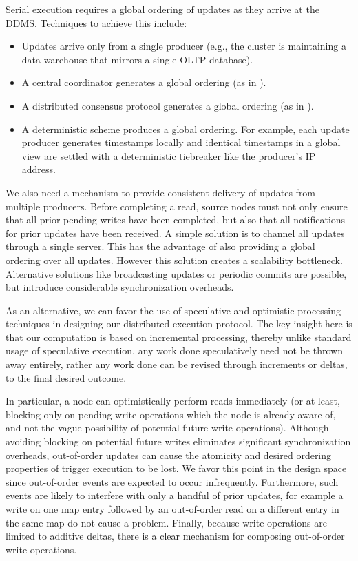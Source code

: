 Serial execution requires a global ordering of updates as they arrive at
the DDMS. Techniques to achieve this include:
\begin{itemize}
\item Updates arrive only from a single producer (e.g., the cluster is
maintaining a data warehouse that mirrors a single OLTP database).
\item A central coordinator generates a global ordering (as in
\cite{peng-incremental:10}).
\item A distributed consensus protocol generates a global ordering (as in
\cite{Junqueira:2009:LTZ:1582716.1582721}).
\item A deterministic scheme produces a global ordering. For example, each
update producer generates timestamps locally and identical timestamps in a
global view are settled with a deterministic tiebreaker like the producer's IP
address.
\end{itemize}

We also need a mechanism to provide consistent delivery of updates from multiple
producers. Before completing a read, source nodes must not only ensure that all
prior pending writes have been completed, but also that all notifications for
prior updates have been received.
A simple solution is to channel all updates through a single server. This has
the advantage of also providing a global ordering over all updates.  However
this solution creates a scalability bottleneck.  Alternative solutions like
broadcasting updates or periodic commits are possible, but introduce
considerable synchronization overheads.

As an alternative, we can favor the use of speculative and optimistic processing
techniques in designing our distributed execution protocol. The key insight here
is that our computation is based on incremental processing, thereby unlike
standard usage of speculative execution, any work done speculatively need not be
thrown away entirely, rather any work done can be revised through increments or
deltas, to the final desired outcome.

In particular, a node can optimistically perform reads immediately (or at least,
blocking only on pending write operations which the node
is already aware of, and not the vague possibility of potential future write
operations).  Although avoiding blocking on potential future writes eliminates
significant synchronization overheads, out-of-order updates can cause the
atomicity and desired ordering properties of trigger execution to be lost.
We favor this point in the design space since out-of-order events are expected
to occur infrequently. Furthermore, such events are likely to interfere with
only a handful of prior updates, for example a write on one map entry followed
by an out-of-order read on a different entry in the same map do not cause a
problem. Finally, because write operations are limited to additive deltas,
there is a clear mechanism for composing out-of-order write operations.

